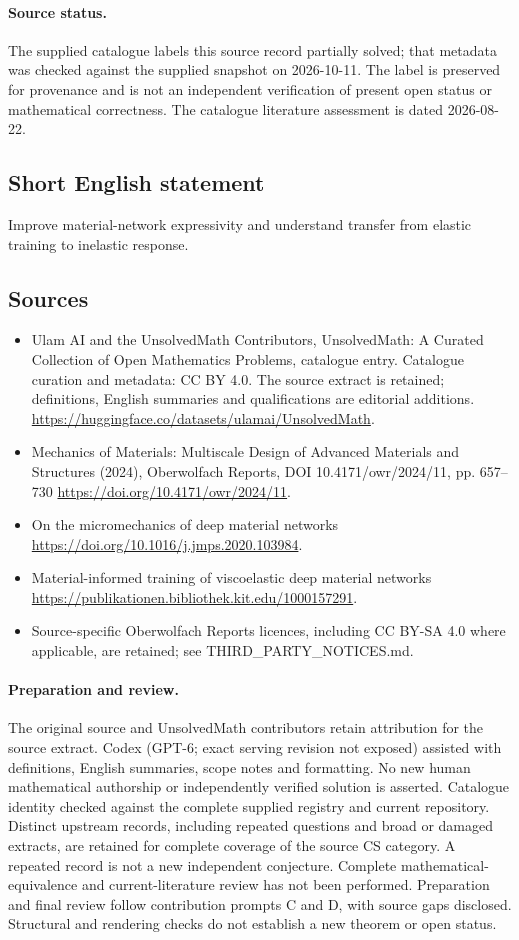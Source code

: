 \documentclass[11pt]{article}
\begin{document}
\paragraph{Source status.}
The supplied catalogue labels this source record partially solved; that metadata was checked against the supplied snapshot on 2026-10-11. The label is preserved for provenance and is not an independent verification of present open status or mathematical correctness. The catalogue literature assessment is dated 2026-08-22.
\subsection{Short English statement}
Improve material-network expressivity and understand transfer from elastic training to inelastic response.
\subsection{Sources}
\begin{itemize}
\item[S1] Ulam AI and the UnsolvedMath Contributors, UnsolvedMath: A Curated Collection of Open Mathematics Problems, catalogue entry. Catalogue curation and metadata: CC BY 4.0. The source extract is retained; definitions, English summaries and qualifications are editorial additions.
\url{https://huggingface.co/datasets/ulamai/UnsolvedMath}.
\item[S2] Mechanics of Materials: Multiscale Design of Advanced Materials and Structures (2024), Oberwolfach Reports, DOI 10.4171/owr/2024/11, pp. 657--730
\url{https://doi.org/10.4171/owr/2024/11}.
\item[S3] On the micromechanics of deep material networks
\url{https://doi.org/10.1016/j.jmps.2020.103984}.
\item[S4] Material-informed training of viscoelastic deep material networks
\url{https://publikationen.bibliothek.kit.edu/1000157291}.
\item Source-specific Oberwolfach Reports licences, including CC BY-SA 4.0 where applicable, are retained; see THIRD\_PARTY\_NOTICES.md.
\end{itemize}
\paragraph{Preparation and review.}
The original source and UnsolvedMath contributors retain attribution for the source extract. Codex (GPT-6; exact serving revision not exposed) assisted with definitions, English summaries, scope notes and formatting. No new human mathematical authorship or independently verified solution is asserted. Catalogue identity checked against the complete supplied registry and current repository. Distinct upstream records, including repeated questions and broad or damaged extracts, are retained for complete coverage of the source CS category. A repeated record is not a new independent conjecture. Complete mathematical-equivalence and current-literature review has not been performed. Preparation and final review follow contribution prompts C and D, with source gaps disclosed. Structural and rendering checks do not establish a new theorem or open status.
\label{end:statement}
\end{document}
